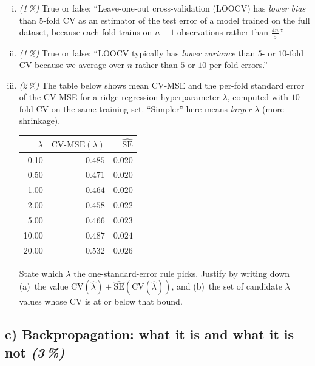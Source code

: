 \documentclass[11pt,a4paper]{article}
\newcommand{\subpoints}[1]{\textit{(#1\,\%)}}
\begin{document}
\begin{enumerate}[(i)]
  \item \subpoints{1} True or false: ``Leave-one-out cross-validation (LOOCV) has \emph{lower bias} than $5$-fold CV as an estimator of the test error of a model trained on the full dataset, because each fold trains on $n-1$ observations rather than $\tfrac{4n}{5}$.''
  \item \subpoints{1} True or false: ``LOOCV typically has \emph{lower variance} than $5$- or $10$-fold CV because we average over $n$ rather than $5$ or $10$ per-fold errors.''
  \item \subpoints{2} The table below shows mean CV-MSE and the per-fold standard error of the CV-MSE for a ridge-regression hyperparameter $\lambda$, computed with $10$-fold CV on the same training set. ``Simpler'' here means \emph{larger} $\lambda$ (more shrinkage).

  \begin{center}\small
  \begin{tabular}{r r r}
  \toprule
  $\lambda$ & $\overline{\mathrm{CV\text{-}MSE}}(\lambda)$ & $\widehat{\mathrm{SE}}$ \\
  \midrule
   0.10 & $0.485$ & $0.020$ \\
   0.50 & $0.471$ & $0.020$ \\
   1.00 & $0.464$ & $0.020$ \\
   2.00 & $\bm{0.458}$ & $\bm{0.022}$ \\
   5.00 & $0.466$ & $0.023$ \\
  10.00 & $0.487$ & $0.024$ \\
  20.00 & $0.532$ & $0.026$ \\
  \bottomrule
  \end{tabular}
  \end{center}

  State which $\lambda$ the one-standard-error rule picks. Justify by writing down (a)~the value $\mathrm{CV}(\hat\lambda) + \widehat{\mathrm{SE}}(\mathrm{CV}(\hat\lambda))$, and (b)~the set of candidate $\lambda$ values whose CV is at or below that bound.
\end{enumerate}

\subsection*{c) Backpropagation: what it is and what it is not \subpoints{3}}
\end{document}
